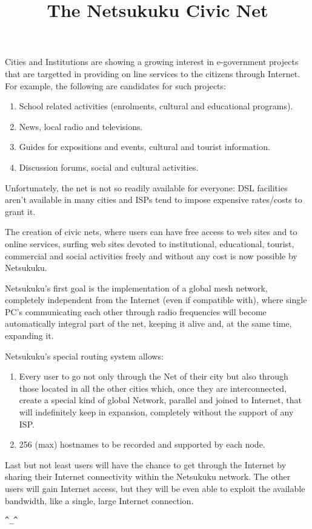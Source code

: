 \documentclass[a4paper,10pt]{article}
\title{The Netsukuku Civic Net}
\author{by\\\begin{small}The Netsukuku team                              \end{small}\\\textit{\begin{small}http://netsukuku.freaknet.org                                        \end{small}}}
\begin{document}
\maketitle
\pagebreak
Cities and Institutions are showing a growing interest in e-government
projects that are targetted in providing on line services to the citizens
through Internet.
For example, the following are candidates for such projects:
\begin{enumerate}
	\item 
School related activities (enrolments, cultural and educational programs).
\item News, local radio and televisions.	                         
\item  Guides for expositions and events, cultural and tourist information.	    
\item  Discussion forums, social and cultural activities.	                        
\end{enumerate}

Unfortunately, the net is not so readily available for everyone: 
DSL facilities aren't available in many cities and ISPs tend
to impose expensive rates/costs to grant it.

The creation of civic nets, where users can have free access to web sites
and to online services, surfing web sites devoted to institutional, educational,
tourist, commercial and social activities freely and without any cost is now
possible by Netsukuku.

Netsukuku's first goal is the implementation of a global mesh network, completely
independent from the Internet (even if compatible with), where single PC's communicating each other
through radio frequencies will become automatically integral part of
the net, keeping it alive and, at the same time, expanding it.

Netsukuku's special routing system allows:
\begin{enumerate}
	\item 
 Every user to go not only through the Net of their city but also through
  those located in all the other cities which, once they are interconnected,
  create a special kind of global Network, parallel and joined to Internet, that will
  indefinitely keep in expansion, completely without the support of any ISP.
\item 256 (max) hostnames to be recorded and supported by each node.
\end{enumerate}

Last but not least users will have the chance to get
through the Internet by sharing their Internet connectivity within the Netsukuku
network. The other users will gain Internet access, but they will be even able
to exploit the available bandwidth, like a single, large Internet connection.

\pagebreak
\begin{center}\verb|^_^|\end{center}
\end{document}
